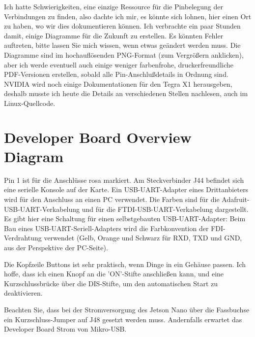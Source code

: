 

Ich hatte Schwierigkeiten, eine einzige Ressource für die Pinbelegung der Verbindungen zu finden, also dachte ich mir, es könnte sich lohnen, hier einen Ort zu haben, wo wir dies dokumentieren können. Ich verbrachte ein paar Stunden damit, einige Diagramme für die Zukunft zu erstellen. Es könnten Fehler auftreten, bitte lassen Sie mich wissen, wenn etwas geändert werden muss. Die Diagramme sind im hochauflösenden PNG-Format (zum Vergrößern anklicken), aber ich werde eventuell auch einige weniger farbenfrohe, druckerfreundliche PDF-Versionen erstellen, sobald alle Pin-Anschlußdetails in Ordnung sind. NVIDIA wird noch einige Dokumentationen für den Tegra X1 herausgeben, deshalb musste ich heute die Details an verschiedenen Stellen nachlesen, auch im Linux-Quellcode.

\section{Developer Board Overview Diagram}


Pin 1 ist für die Anschlüsse rosa markiert. Am Steckverbinder J44 befindet sich eine serielle Konsole auf der Karte. Ein USB-UART-Adapter eines Drittanbieters wird für den Anschluss an einen PC verwendet. Die Farben sind für die Adafruit-USB-UART-Verkabelung und für die FTDI-USB-UART-Verkabelung dargestellt. Es gibt hier eine Schaltung für einen selbstgebauten USB-UART-Adapter: Beim Bau eines USB-UART-Seriell-Adapters wird die Farbkonvention der FDI-Verdrahtung verwendet (Gelb, Orange und Schwarz für RXD, TXD und GND, aus der Perspektive der PC-Seite).

\bigskip

Die Kopfzeile Buttons ist sehr praktisch, wenn Dinge in ein Gehäuse passen. Ich hoffe, dass ich einen Knopf an die 'ON'-Stifte anschließen kann, und eine Kurzschlussbrücke über die DIS-Stifte, um den automatischen Start zu deaktivieren.

\bigskip

Beachten Sie, dass bei der Stromversorgung des Jetson Nano über die Fassbuchse ein Kurzschluss-Jumper auf J48 gesetzt werden muss. Andernfalls erwartet das Developer Board Strom von Mikro-USB.






